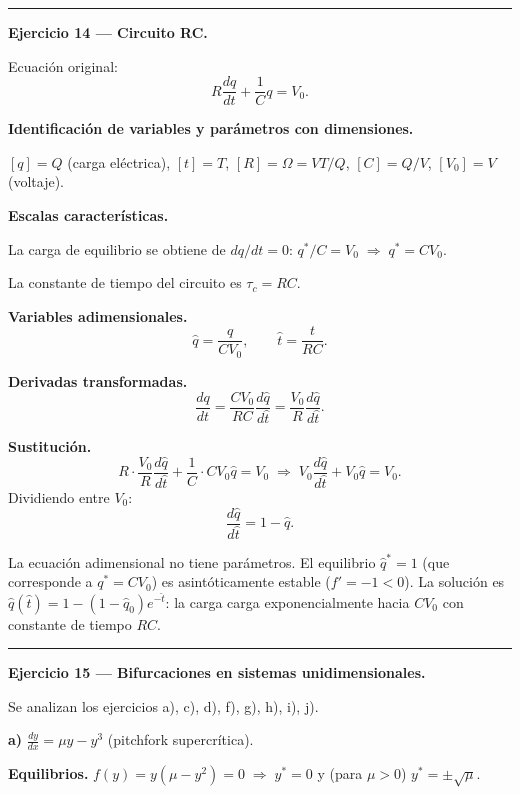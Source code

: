 \documentclass[12pt,letterpaper]{article}
\begin{document}
\bigskip
\noindent\rule{\textwidth}{0.3pt}
\bigskip

\noindent\textbf{Ejercicio 14 — Circuito RC.}

Ecuación original:
\[
  R\frac{dq}{dt}+\frac{1}{C}q=V_0.
\]

\textbf{Identificación de variables y parámetros con dimensiones.}

$[q]=Q$ (carga eléctrica), $[t]=T$, $[R]=\Omega=VT/Q$,
$[C]=Q/V$, $[V_0]=V$ (voltaje).

\textbf{Escalas características.}

La carga de equilibrio se obtiene de $dq/dt=0$:
$q^*/C=V_0\;\Rightarrow\; q^*=CV_0$.

La constante de tiempo del circuito es $\tau_c=RC$.

\textbf{Variables adimensionales.}
\[
  \hat{q}=\frac{q}{CV_0},\qquad
  \hat{t}=\frac{t}{RC}.
\]

\textbf{Derivadas transformadas.}
\[
  \frac{dq}{dt}=\frac{CV_0}{RC}\frac{d\hat{q}}{d\hat{t}}=\frac{V_0}{R}\frac{d\hat{q}}{d\hat{t}}.
\]

\textbf{Sustitución.}
\[
  R\cdot\frac{V_0}{R}\frac{d\hat{q}}{d\hat{t}}+\frac{1}{C}\cdot CV_0\hat{q}=V_0
  \;\Longrightarrow\;
  V_0\frac{d\hat{q}}{d\hat{t}}+V_0\hat{q}=V_0.
\]
Dividiendo entre $V_0$:
\[
  \boxed{\frac{d\hat{q}}{d\hat{t}}=1-\hat{q}.}
\]

La ecuación adimensional no tiene parámetros.
El equilibrio $\hat{q}^*=1$ (que corresponde a $q^*=CV_0$)
es asintóticamente estable ($f'=-1<0$).
La solución es $\hat{q}(\hat{t})=1-(1-\hat{q}_0)e^{-\hat{t}}$:
la carga carga exponencialmente hacia $CV_0$ con constante de tiempo $RC$.

\bigskip
\noindent\rule{\textwidth}{0.3pt}
\bigskip


\noindent\textbf{Ejercicio 15 — Bifurcaciones en sistemas unidimensionales.}

Se analizan los ejercicios a), c), d), f), g), h), i), j).

\bigskip
\noindent\textbf{a)} $\displaystyle\frac{dy}{dx}=\mu y-y^3$ \quad (pitchfork supercrítica).

\textbf{Equilibrios.} $f(y)=y(\mu-y^2)=0\;\Rightarrow\; y^*=0$ y (para $\mu>0$) $y^*=\pm\sqrt{\mu}$.
\end{document}
